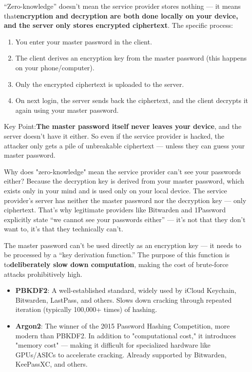 
“Zero-knowledge” doesn't mean the service provider stores nothing — it means that\textbf{encryption and decryption are both done locally on your device, and the server only stores encrypted ciphertext}. The specific process:

\begin{enumerate}
  \item You enter your master password in the client.
  \item The client derives an encryption key from the master password (this happens on your phone/computer).
  \item Only the encrypted ciphertext is uploaded to the server.
  \item On next login, the server sends back the ciphertext, and the client decrypts it again using your master password.
\end{enumerate}

Key Point:\textbf{The master password itself never leaves your device}, and the server doesn't have it either. So even if the service provider is hacked, the attacker only gets a pile of unbreakable ciphertext — unless they can guess your master password.

\begin{tcbinfo}{Why does "zero-knowledge" mean the service provider can't see your passwords either?}
Because the decryption key is derived from your master password, which exists only in your mind and is used only on your local device. The service provider's server has neither the master password nor the decryption key — only ciphertext. That's why legitimate providers like Bitwarden and 1Password explicitly state “we cannot see your passwords either” — it's not that they don't want to, it's that they technically can't.

\end{tcbinfo}


The master password can't be used directly as an encryption key — it needs to be processed by a “key derivation function.” The purpose of this function is to\textbf{deliberately slow down computation}, making the cost of brute-force attacks prohibitively high.

\begin{itemize}
  \item \textbf{PBKDF2}: A well-established standard, widely used by iCloud Keychain, Bitwarden, LastPass, and others. Slows down cracking through repeated iteration (typically 100,000+ times) of hashing.
  \item \textbf{Argon2}: The winner of the 2015 Password Hashing Competition, more modern than PBKDF2. In addition to "computational cost," it introduces "memory cost" — making it difficult for specialized hardware like GPUs/ASICs to accelerate cracking. Already supported by Bitwarden, KeePassXC, and others.
\end{itemize}


